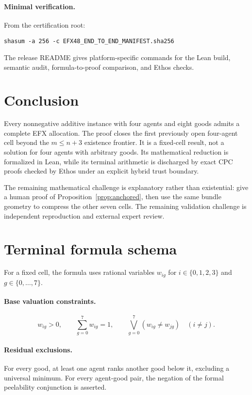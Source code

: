 \documentclass[11pt]{article}
\theoremstyle{definition}
\begin{document}
\paragraph{Minimal verification.}
From the certification root:
\begin{verbatim}
shasum -a 256 -c EFX48_END_TO_END_MANIFEST.sha256
\end{verbatim}
The release README gives platform-specific commands for the Lean build,
semantic audit, formula-to-proof comparison, and Ethos checks.

\section{Conclusion}\label{sec:conclusion}

Every nonnegative additive instance with four agents and eight goods admits a
complete EFX allocation. The proof closes the first previously open
four-agent cell beyond the $m\le n+3$ existence frontier. It is a fixed-cell
result, not a solution for four agents with arbitrary goods. Its mathematical
reduction is formalized in Lean, while its terminal arithmetic is discharged
by exact CPC proofs checked by Ethos under an explicit hybrid trust boundary.

The remaining mathematical challenge is explanatory rather than existential:
give a human proof of Proposition~\ref{prop:anchored}, then use the same
bundle geometry to compress the other seven cells. The remaining validation
challenge is independent reproduction and external expert review.

\appendix

\section{Terminal formula schema}\label{app:schema}

For a fixed cell, the formula uses rational variables $w_{ig}$ for
$i\in\{0,1,2,3\}$ and $g\in\{0,\ldots,7\}$.

\paragraph{Base valuation constraints.}
\[
  w_{ig}>0,\qquad \sum_{g=0}^{7}w_{ig}=1,
  \qquad \bigvee_{g=0}^{7}(w_{ig}\ne w_{jg})\quad(i\ne j).
\]

\paragraph{Residual exclusions.}
For every good, at least one agent ranks another good below it, excluding a
universal minimum. For every agent-good pair, the negation of the formal
peelability conjunction is asserted.
\end{document}

